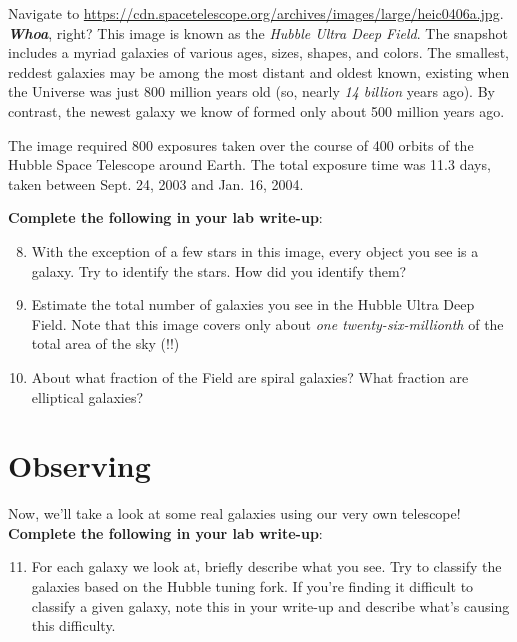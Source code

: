 \documentclass[11pt]{article}
\begin{document}
Navigate to \url{https://cdn.spacetelescope.org/archives/images/large/heic0406a.jpg}.
\\\textbf{\textit{Whoa}}, right? This image is known as the \textit{Hubble Ultra Deep Field}. The snapshot includes a myriad galaxies of various ages, sizes, shapes, and colors. The smallest, reddest galaxies may be among the most distant and oldest known, existing when the Universe was just 800 million years old (so, nearly \emph{14 billion} years ago). By contrast, the newest galaxy we know of formed only about 500 million years ago.

\medskip \noindent
The image required 800 exposures taken over the course of 400 orbits of the Hubble Space Telescope around Earth. The total exposure time was 11.3 days, taken between Sept. 24, 2003 and Jan. 16, 2004.

\medskip \noindent
\textbf{Complete the following in your lab write-up}:
\begin{enumerate}
\setcounter{enumi}{7}
    \item With the exception of a few stars in this image, every object you see is a galaxy. Try to identify the stars. How did you identify them?
    
    \item Estimate the total number of galaxies you see in the Hubble Ultra Deep Field. Note that this image covers only about \emph{one twenty-six-millionth} of the total area of the sky (!!)
    
    \item About what fraction of the Field are spiral galaxies? What fraction are elliptical galaxies?

\end{enumerate}

\medskip

\section{Observing}

Now, we'll take a look at some real galaxies using our very own telescope! \textbf{Complete the following in your lab write-up}:
\begin{enumerate}
\setcounter{enumi}{10}
    \item For each galaxy we look at, briefly describe what you see. Try to classify the galaxies based on the Hubble tuning fork. If you're finding it difficult to classify a given galaxy, note this in your write-up and describe what's causing this difficulty. 
\end{enumerate}
\end{document}
